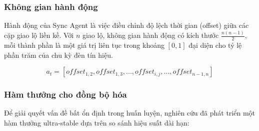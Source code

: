 \subsubsection{Không gian hành động}
Hành động của Sync Agent là việc điều chỉnh độ lệch thời gian (offset) giữa các cặp giao lộ liền kề. Với $n$ giao lộ, không gian hành động có kích thước $\frac{n(n-1)}{2}$, mỗi thành phần là một giá trị liên tục trong khoảng $[0, 1]$ đại diện cho tỷ lệ phần trăm của chu kỳ đèn tín hiệu.

\[
    a_{t} = [offset_{1,2}, offset_{1,3}, ..., offset_{i,j}, ..., offset_{n-1,n}]
\]

\subsubsection{Hàm thưởng cho đồng bộ hóa}
Để giải quyết vấn đề bất ổn định trong huấn luyện, nghiên cứu đã phát triển một hàm thưởng ultra-stable dựa trên so sánh hiệu suất dài hạn:



